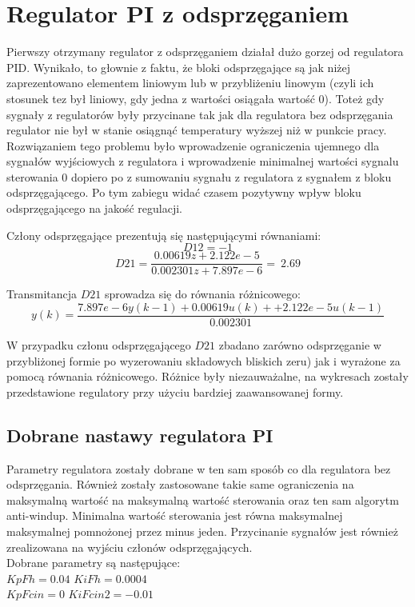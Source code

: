 \section{Regulator PI z odsprzęganiem}
\indent Pierwszy otrzymany regulator z odsprzęganiem działał dużo gorzej od regulatora PID. Wynikało, to głownie z faktu, że bloki odsprzęgające są jak niżej zaprezentowano elementem liniowym lub w przybliżeniu linowym (czyli ich stosunek tez był liniowy, gdy jedna z wartości osiągała wartość 0). Toteż gdy sygnały z regulatorów były przycinane tak jak dla regulatora bez odsprzęgania regulator nie był w stanie osiągnąć temperatury wyższej niż w punkcie pracy. Rozwiązaniem tego problemu było wprowadzenie ograniczenia ujemnego dla sygnałów wyjściowych z regulatora i wprowadzenie minimalnej wartości sygnalu sterowania 0 dopiero po z sumowaniu sygnału z regulatora z sygnałem z bloku odsprzęgającego. Po tym zabiegu widać czasem pozytywny wpływ bloku odsprzęgającego na jakość regulacji.

\indent Człony odsprzęgające prezentują się następującymi równaniami:\\
\begin{equation}
    D12=-1
\end{equation}
\begin{equation}
    D21=\frac{0.00619z+2.122e-5}{0.002301z+7.897e-6}=~2.69
\end{equation}

\indent Transmitancja $D21$ sprowadza się do równania różnicowego:
\begin{equation}
    y(k)=\frac{7.897e-6y(k-1)+0.00619u(k)++2.122e-5u(k-1)}{0.002301}
\end{equation}

 W przypadku członu odsprzęgającego $D21$ zbadano zarówno odsprzęganie w przybliżonej formie  po wyzerowaniu składowych bliskich zeru) jak i wyrażone za pomocą równania różnicowego. Różnice były niezauważalne, na wykresach zostały przedstawione regulatory przy użyciu bardziej zaawansowanej formy.

\subsection{Dobrane nastawy regulatora PI}
\indent Parametry regulatora zostały dobrane w ten sam sposób co dla regulatora bez odsprzęgania. Również zostały zastosowane takie same ograniczenia na maksymalną wartość na maksymalną wartość sterowania oraz ten sam algorytm anti-windup. Minimalna wartość sterowania jest równa maksymalnej maksymalnej pomnożonej przez minus jeden. Przycinanie sygnałów jest również zrealizowana na wyjściu członów odsprzęgających.\\
\indent Dobrane parametry są następujące: \\
$KpFh=0.04$   $KiFh= 0.0004$ \\
$KpFcin= 0$  $ KiFcin2=-0.01$ \\



